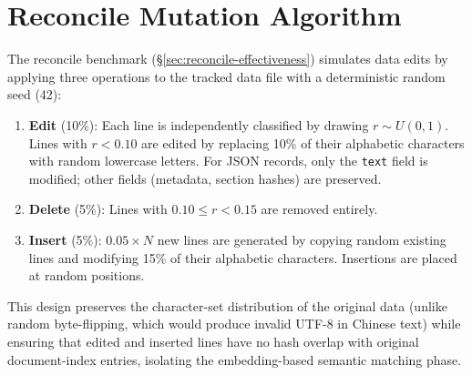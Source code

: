 \section{Reconcile Mutation Algorithm}
\label{sec:mutation}

The reconcile benchmark (\S\ref{sec:reconcile-effectiveness}) simulates data edits by applying three operations to the tracked data file with a deterministic random seed (42):

\begin{enumerate}
	\item \textbf{Edit} (10\%): Each line is independently classified by drawing $r \sim U(0,1)$. Lines with $r < 0.10$ are edited by replacing 10\% of their alphabetic characters with random lowercase letters. For JSON records, only the \texttt{text} field is modified; other fields (metadata, section hashes) are preserved.
	\item \textbf{Delete} (5\%): Lines with $0.10 \leq r < 0.15$ are removed entirely.
	\item \textbf{Insert} (5\%): $0.05 \times N$ new lines are generated by copying random existing lines and modifying 15\% of their alphabetic characters. Insertions are placed at random positions.
\end{enumerate}

This design preserves the character-set distribution of the original data (unlike random byte-flipping, which would produce invalid UTF-8 in Chinese text) while ensuring that edited and inserted lines have no hash overlap with original document-index entries, isolating the embedding-based semantic matching phase.
